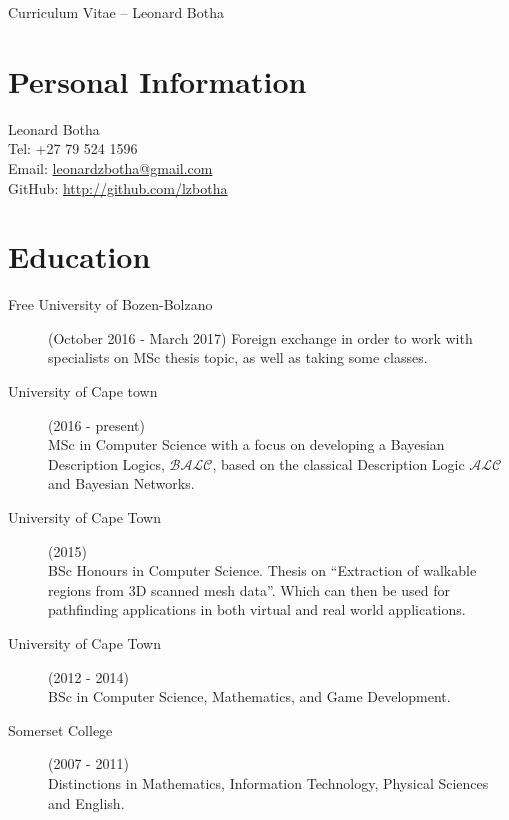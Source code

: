 \documentclass[margin,line,a4paper]{resume}
\begin{document}
    {\sc \Large Curriculum Vitae -- Leonard Botha}
    \begin{resume}
        \vspace{0.5cm}

        \section{\mysidestyle Personal Information}
            Leonard Botha\\
            Tel: +27 79 524 1596\\
            Email: \href{mailto:leonardzbotha@gmail.com}{leonardzbotha@gmail.com}\\
            GitHub: \href{http://github.com/lzbotha}{http://github.com/lzbotha}\\

        \section{\mysidestyle Education}
            \begin{description}
                \item[Free University of Bozen-Bolzano] (October 2016 - March 2017)
                    Foreign exchange in order to work with specialists on MSc thesis topic, as well as taking some classes.

                \item[University of Cape town] (2016 - present)\\
                    MSc in Computer Science with a focus on developing a Bayesian Description Logics, $\mathcal{BALC}$, based on the classical Description Logic $\mathcal{ALC}$ and Bayesian Networks.

                \item[University of Cape Town] (2015) \\
                    BSc Honours in Computer Science. Thesis on ``Extraction of  walkable regions from 3D scanned mesh data''.
                    Which can then be used for pathfinding applications in both virtual and real world applications.

                \item[University of Cape Town] (2012 - 2014) \\
                    BSc in Computer Science, Mathematics, and Game Development.

                \item[Somerset College](2007 - 2011)\\
                    Distinctions in Mathematics, Information Technology, Physical Sciences and English.
            \end{description}



\end{resume}
\end{document}
